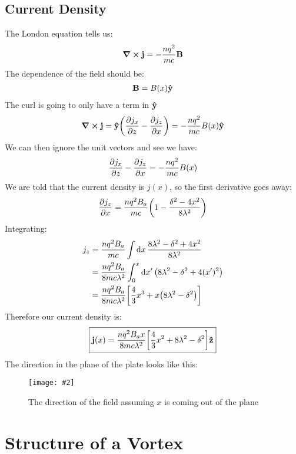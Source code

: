 \documentclass[12pt]{article}
\newcommand{\fig}[3]
{
  \begin{figure}[H]
    \centering
    \texttt{[image: \#2]}
    \caption{#3}
  \end{figure}
}
\begin{document}
\subsection{Current Density}
The London equation tells us:
\begin{align*}
  \curl{\vb{j}}=-\frac{nq^2}{mc}\vb{B}
\end{align*}
The dependence of the field should be:
\begin{align*}
  \vb{B}=B(x)\vu{y}
\end{align*}
The curl is going to only have a term in $\vu{y}$
\begin{align*}
  \curl\vb{j}=\vu{y}\qty(\pdv{j_x}{z}-\pdv{j_z}{x})=-\frac{nq^2}{mc}B(x)\vu{y}
\end{align*}
We can then ignore the unit vectors and see we have:
\begin{align*}
  \pdv{j_x}{z}-\pdv{j_z}{x}=-\frac{nq^2}{mc}B(x)
\end{align*}
We are told that the current density is $j(x)$, so the first derivative goes away:
\begin{align*}
  \pdv{j_z}{x}=\frac{nq^2B_a}{mc}\qty(1-\frac{\delta^2-4x^2}{8\lambda^2})
\end{align*}
Integrating:
\begin{align*}
  j_z&=\frac{nq^2B_a}{mc}\int\dd{x}\frac{8\lambda^2-\delta^2+4x^2}
  {8\lambda^2}\\ &=\frac{nq^2B_a}{8mc\lambda^2}
  \int_0^x\dd{x'}\qty(8\lambda^2-\delta^2+4(x')^2)\\
  &=\frac{nq^2B_a}{8mc\lambda^2}\qty[\frac43x^3+x\qty(8\lambda^2-\delta^2)]
\end{align*}
Therefore our current density is:
\begin{align*}
  \boxed{\vb{j}(x)=\frac{nq^2B_ax}{8mc\lambda^2}
  \qty[\frac43x^2+8\lambda^2-\delta^2]\vu{z}}
\end{align*}
The direction in the plane of the plate looks like this:
\fig{10.0}{zhat}{The direction of the field assuming $x$ is coming out of the plane}
\newpage\section{Structure of a Vortex}
\end{document}
